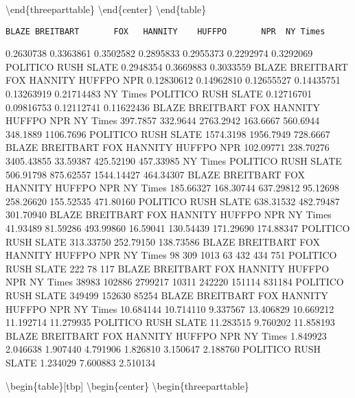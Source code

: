 \documentclass[english,,man]{apa6}
\begin{document}
\textbackslash{}end\{threeparttable\}
\textbackslash{}end\{center\}
\textbackslash{}end\{table\}

\begin{verbatim}
BLAZE BREITBART       FOX   HANNITY    HUFFPO       NPR  NY Times 
\end{verbatim}

0.2630738 0.3363861 0.3502582 0.2895833 0.2955373 0.2292974 0.3292069
POLITICO RUSH SLATE
0.2948354 0.3669883 0.3033559
BLAZE BREITBART FOX HANNITY HUFFPO NPR
0.12830612 0.14962810 0.12655527 0.14435751 0.13263919 0.21714483
NY Times POLITICO RUSH SLATE
0.12716701 0.09816753 0.12112741 0.11622436
BLAZE BREITBART FOX HANNITY HUFFPO NPR NY Times
397.7857 332.9644 2763.2942 163.6667 560.6944 348.1889 1106.7696
POLITICO RUSH SLATE
1574.3198 1956.7949 728.6667
BLAZE BREITBART FOX HANNITY HUFFPO NPR
102.09771 238.70276 3405.43855 33.59387 425.52190 457.33985
NY Times POLITICO RUSH SLATE
506.91798 875.62557 1544.14427 464.34307
BLAZE BREITBART FOX HANNITY HUFFPO NPR NY Times
185.66327 168.30744 637.29812 95.12698 258.26620 155.52535 471.80160
POLITICO RUSH SLATE
638.31532 482.79487 301.70940
BLAZE BREITBART FOX HANNITY HUFFPO NPR NY Times
41.93489 81.59286 493.99860 16.59041 130.54439 171.29690 174.88347
POLITICO RUSH SLATE
313.33750 252.79150 138.73586
BLAZE BREITBART FOX HANNITY HUFFPO NPR NY Times
98 309 1013 63 432 434 751
POLITICO RUSH SLATE
222 78 117
BLAZE BREITBART FOX HANNITY HUFFPO NPR NY Times
38983 102886 2799217 10311 242220 151114 831184
POLITICO RUSH SLATE
349499 152630 85254
BLAZE BREITBART FOX HANNITY HUFFPO NPR NY Times
10.684144 10.714110 9.337567 13.406829 10.669212 11.192714 11.279935
POLITICO RUSH SLATE
11.283515 9.760202 11.858193
BLAZE BREITBART FOX HANNITY HUFFPO NPR NY Times
1.849923 2.046638 1.907440 4.791906 1.826810 3.150647 2.188760
POLITICO RUSH SLATE
1.234029 7.600883 2.510134

\textbackslash{}begin\{table\}{[}tbp{]}
\textbackslash{}begin\{center\}
\textbackslash{}begin\{threeparttable\}

\caption{\label{tab:exp2_source_descriptives_gs}}
\end{document}
